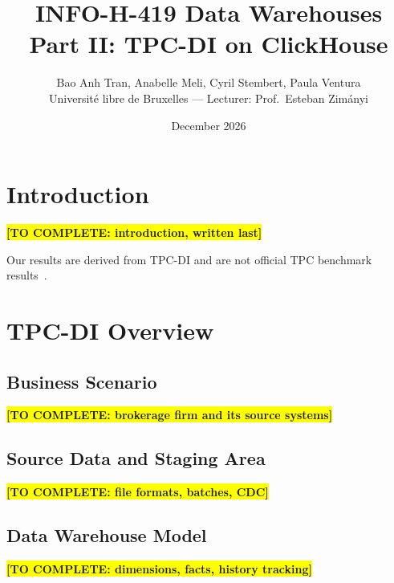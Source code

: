 \documentclass[11pt,a4paper]{article}
\title{\textbf{INFO-H-419 Data Warehouses}\\[4pt]
       \Large Part II: TPC-DI on ClickHouse}
\author{Bao Anh Tran, Anabelle Meli, Cyril Stembert, Paula Ventura\\[4pt]
        \small Université libre de Bruxelles --- Lecturer: Prof.\ Esteban Zimányi}
\date{December 2026}
\newcommand{\todo}[1]{\colorbox{yellow}{\textbf{[TO COMPLETE: #1]}}}
\begin{document}
\maketitle
\tableofcontents
\newpage

\section{Introduction}
\label{sec:intro}

\todo{introduction, written last}

Our results are derived from TPC-DI and are not official TPC benchmark results~\cite{r1}.

\section{TPC-DI Overview}
\label{sec:tpcdi}

\subsection{Business Scenario}
\todo{brokerage firm and its source systems}

\subsection{Source Data and Staging Area}
\todo{file formats, batches, CDC}

\subsection{Data Warehouse Model}
\todo{dimensions, facts, history tracking}
\end{document}
